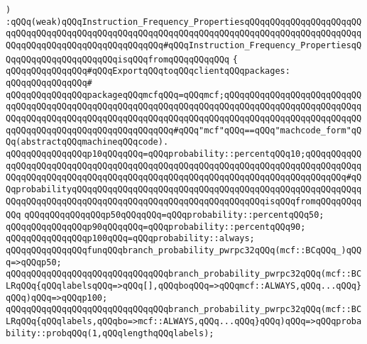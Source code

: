 \verb|)|\newline
\verb|:qQQq(weak)qQQqInstruction_Frequency_PropertiesqQQqqQQqqQQqqQQqqQQqqQQqqQQqqQQqqQQqqQQqqQQqqQQqqQQqqQQqqQQqqQQqqQQqqQQqqQQqqQQqqQQqqQQqqQQqqQQqqQQqqQQqqQQqqQQqqQQqqQQqqQQq#qQQqInstruction_Frequency_PropertiesqQQqqQQqqQQqqQQqqQQqqQQqisqQQqfromqQQqqQQqqQQq|\newline
\verb|{|\newline
\verb|qQQqqQQqqQQqqQQq#qQQqExportqQQqtoqQQqclientqQQqpackages:|\newline
\verb|qQQqqQQqqQQqqQQq#|\newline
\verb|qQQqqQQqqQQqqQQqpackageqQQqmcfqQQq=qQQqmcf;qQQqqQQqqQQqqQQqqQQqqQQqqQQqqQQqqQQqqQQqqQQqqQQqqQQqqQQqqQQqqQQqqQQqqQQqqQQqqQQqqQQqqQQqqQQqqQQqqQQqqQQqqQQqqQQqqQQqqQQqqQQqqQQqqQQqqQQqqQQqqQQqqQQqqQQqqQQqqQQqqQQqqQQqqQQqqQQqqQQqqQQqqQQqqQQqqQQqqQQq#qQQq"mcf"qQQq==qQQq"machcode_form"qQQq(abstractqQQqmachineqQQqcode).|\newline
\newline
\verb|qQQqqQQqqQQqqQQqp10qQQqqQQq=qQQqprobability::percentqQQq10;qQQqqQQqqQQqqQQqqQQqqQQqqQQqqQQqqQQqqQQqqQQqqQQqqQQqqQQqqQQqqQQqqQQqqQQqqQQqqQQqqQQqqQQqqQQqqQQqqQQqqQQqqQQqqQQqqQQqqQQqqQQqqQQqqQQqqQQqqQQqqQQqqQQq#qQQqprobabilityqQQqqQQqqQQqqQQqqQQqqQQqqQQqqQQqqQQqqQQqqQQqqQQqqQQqqQQqqQQqqQQqqQQqqQQqqQQqqQQqqQQqqQQqqQQqqQQqqQQqqQQqqQQqisqQQqfromqQQqqQQqqQQq|\newline
\verb|qQQqqQQqqQQqqQQqp50qQQqqQQq=qQQqprobability::percentqQQq50;|\newline
\verb|qQQqqQQqqQQqqQQqp90qQQqqQQq=qQQqprobability::percentqQQq90;|\newline
\verb|qQQqqQQqqQQqqQQqp100qQQq=qQQqprobability::always;|\newline
\newline
\verb|qQQqqQQqqQQqqQQqfunqQQqbranch_probability_pwrpc32qQQq(mcf::BCqQQq_)qQQq=>qQQqp50;|\newline
\verb|qQQqqQQqqQQqqQQqqQQqqQQqqQQqqQQqbranch_probability_pwrpc32qQQq(mcf::BCLRqQQq{qQQqlabelsqQQq=>qQQq[],qQQqboqQQq=>qQQqmcf::ALWAYS,qQQq...qQQq}qQQq)qQQq=>qQQqp100;|\newline
\verb|qQQqqQQqqQQqqQQqqQQqqQQqqQQqqQQqbranch_probability_pwrpc32qQQq(mcf::BCLRqQQq{qQQqlabels,qQQqbo=>mcf::ALWAYS,qQQq...qQQq}qQQq)qQQq=>qQQqprobability::probqQQq(1,qQQqlengthqQQqlabels);|\newline
